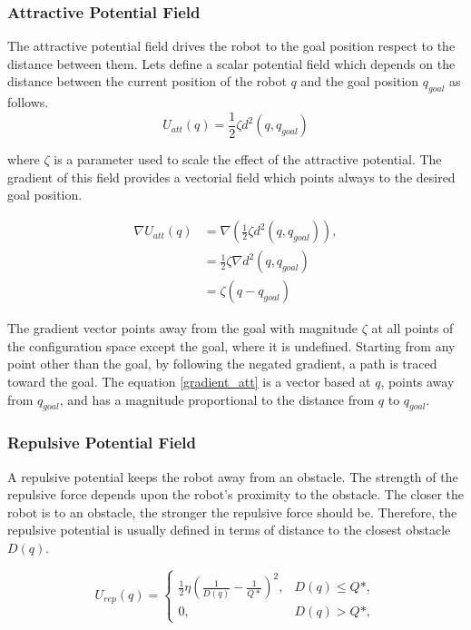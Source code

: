 \documentclass[conference]{IEEEtran}
\begin{document}
\subsubsection{\textbf{Attractive Potential Field}}
The attractive potential field drives the robot to the goal position respect to the distance between them. Lets define a scalar potential field which depends on the distance between the current position of the robot $q$ and the goal position $q_{goal}$ as follows. 
\begin{equation}
	U_{att}(q) = \frac{1}{2} \zeta d^2(q,q_{goal})
	\label{eq:pot_attr}
\end{equation}

where  $\zeta$  is a parameter used to scale the effect of the attractive potential. The gradient of this field provides a vectorial field which points always to the desired goal position.

\begin{equation}
	\label{gradient_att}
	\begin{aligned}
		\nabla U_{att}(q) &= \nabla (\frac{1}{2}\zeta d^2 (q,q_{goal})),\\
		&=\frac{1}{2}\zeta \nabla d^2(q,q_{goal})\\
		&= \zeta(q - q_{goal})
	\end{aligned}
\end{equation}

The gradient vector points away from the goal with magnitude $\zeta$ at all points of the configuration space except the goal, where it is undefined. Starting from any point other than the goal, by following the negated gradient, a path is traced toward the goal. The equation \ref{gradient_att} is a vector based at $q$, points away from $q_{goal}$, and has a magnitude proportional to the distance from $q$ to $q_{goal}$.\\

\subsubsection{\textbf{Repulsive Potential Field}}

A repulsive potential keeps the robot away from an obstacle. The strength of the repulsive force depends upon the robot's proximity to the obstacle. The closer the robot is to an obstacle, the stronger the repulsive force should be. Therefore, the repulsive potential is usually defined in terms of distance to the closest obstacle $D(q)$.

\begin{equation}
	U_{rep}(q) = 
		\begin{cases}
			\frac{1}{2}\eta(\frac{1}{D(q)} - \frac{1}{Q*})^2, & D(q)\leq Q*, \\
			0, & D(q) > Q*,
		\end{cases}
	\label{eq:pot_rep}
\end{equation}
\end{document}
